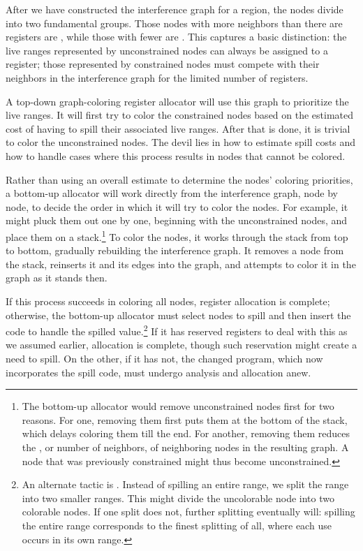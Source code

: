 After we have constructed the interference graph for a region, the nodes divide into two fundamental groups. Those nodes with more neighbors than there are registers are , while those with fewer are . This captures a basic distinction: the live ranges represented by unconstrained nodes can always be assigned to a register; those represented by constrained nodes must compete with their neighbors in the interference graph for the limited number of registers.

A top-down graph-coloring register allocator will use this graph to prioritize the live ranges. It will first try to color the constrained nodes based on the estimated cost of having to spill their associated live ranges. After that is done, it is trivial to color the unconstrained nodes. The devil lies in how to estimate spill costs and how to handle cases where this process results in nodes that cannot be colored. 

Rather than using an overall estimate to determine the nodes' coloring priorities, a bottom-up allocator will work directly from the interference graph, node by node, to decide the order in which it will try to color the nodes. For example, it might pluck them out one by one, beginning with the unconstrained nodes, and place them on a stack.\footnote{The bottom-up allocator would remove unconstrained nodes first for two reasons. For one, removing them first puts them at the bottom of the stack, which delays coloring them till the end. For another, removing them reduces the , or number of neighbors, of neighboring nodes in the resulting graph. A node that was previously constrained might thus become unconstrained.} To color the nodes, it works through the stack from top to bottom, gradually rebuilding the interference graph. It removes a node from the stack, reinserts it and its edges into the graph, and attempts to color it in the graph as it stands then.

If this process succeeds in coloring all nodes, register allocation is complete; otherwise, the bottom-up allocator must select nodes to spill and then insert the code to handle the spilled value.\footnote{An alternate tactic is . Instead of spilling an entire range, we split the range into two smaller ranges. This might divide the uncolorable node into two colorable nodes. If one split does not, further splitting eventually will: spilling the entire range corresponds to the finest splitting of all, where each use occurs in its own range.} If it has reserved registers to deal with this as we assumed earlier, allocation is complete, though such reservation might create a need to spill. On the other, if it has not, the changed program, which now incorporates the spill code, must undergo analysis and allocation anew.


